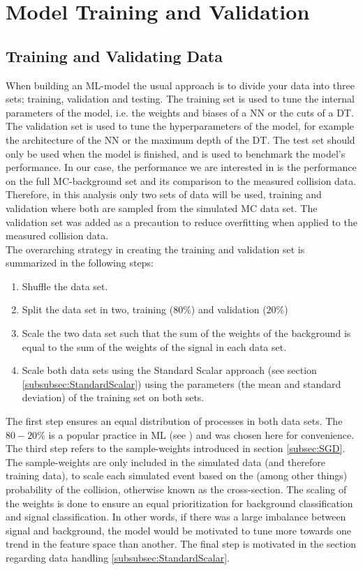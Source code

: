 \newpage
\section{Model Training and Validation}
\subsection{Training and Validating Data}\label{subsec:TraVal}
When building an \ac{ML}-model the usual approach is to divide your data into three sets; training, validation and 
testing. The training set is used to tune the internal parameters of the model, i.e. the weights and biases of a \ac{NN} or the cuts of a \ac{DT}.
The validation set is used to tune the hyperparameters of the model, for example the architecture of the \ac{NN} or the maximum depth of the \ac{DT}.
The test set should only be used when the model is finished, and is used to benchmark the model's performance. In our case, the performance we are 
interested in is the performance on the full \ac{MC}-background set and its comparison to the measured collision data. 
Therefore, in this analysis only two sets of data will be used, training and validation where both are sampled from the simulated
\ac{MC} data set. The validation set was added as a precaution to reduce overfitting when applied to the measured collision data.
\\
The overarching strategy in creating the training and validation set is summarized in the following steps:
\begin{enumerate}
    \item Shuffle the data set. 
    \item Split the data set in two, training ($80\%$) and validation ($20\%$)
    \item Scale the two data set such that the sum of the weights of the background is equal to the sum of the weights of the signal in each data set.
    \item Scale both data sets using the Standard Scalar approach (see section \ref{subsubsec:StandardScalar}) using the parameters (the mean and standard deviation) 
    of the training set on both sets.
\end{enumerate}
The first step ensures an equal distribution of processes in both data sets. The $80-20\%$ is a popular practice in \ac{ML} (see \cite{8020}) and was chosen 
here for convenience. The third step refers to the sample-weights introduced in section \ref{subsec:SGD}. The sample-weights are only included in the simulated data
(and therefore training data), to scale each simulated event based on the (among other things) probability of the collision, otherwise known as the cross-section. The scaling of the 
weights is done to ensure an equal prioritization for background classification and signal classification. In other words, if there was a large imbalance between signal and background, 
the model would be motivated to tune more towards one trend in the feature space than another. The final step is motivated in the section regarding data handling \ref{subsubsec:StandardScalar}. 

